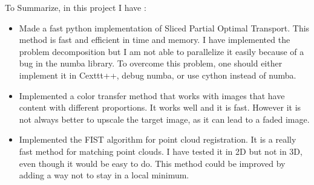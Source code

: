 \documentclass[a4paper,12pt]{article}
\begin{document}
\bigskip


To Summarize, in this project I have :
\begin{itemize}
\item Made a fast python implementation of Sliced Partial Optimal Transport. This method is fast and efficient in time and memory. I have implemented the problem decomposition but I am not able to parallelize it easily because of a bug in the numba library. To overcome this problem, one should either implement it in Cexttt{++}, debug numba, or use cython instead of numba.
\item Implemented a color transfer method that works with images that have content with different proportions. It works well and it is fast. However it is not always better to upscale the target image, as it can lead to a faded image.
\item Implemented the FIST algorithm for point cloud registration. It is a really fast method for matching point clouds. I have tested it in 2D but not in 3D, even though it would be easy to do. This method could be improved by adding a way not to stay in a local minimum.
\end{itemize}






\end{document}
